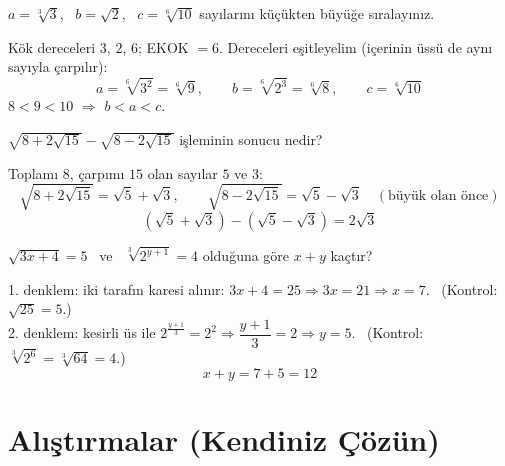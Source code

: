 \begin{alistirma}
\(a=\sqrt[3]{3}\), \ \(b=\sqrt2\), \ \(c=\sqrt[6]{10}\) sayılarını küçükten büyüğe sıralayınız.
\end{alistirma}
\begin{cozum}
Kök dereceleri \(3\), \(2\), \(6\); EKOK \(=6\). Dereceleri eşitleyelim (içerinin üssü de aynı sayıyla çarpılır):
\[a=\sqrt[6]{3^2}=\sqrt[6]{9},\qquad b=\sqrt[6]{2^3}=\sqrt[6]{8},\qquad c=\sqrt[6]{10}\]
\(8<9<10\) \(\Rightarrow\) \(b<a<c\).
\end{cozum}

\begin{alistirma}
\(\sqrt{8+2\sqrt{15}}-\sqrt{8-2\sqrt{15}}\) işleminin sonucu nedir?
\end{alistirma}
\begin{cozum}
Toplamı \(8\), çarpımı \(15\) olan sayılar \(5\) ve \(3\):
\[\sqrt{8+2\sqrt{15}}=\sqrt5+\sqrt3,\qquad \sqrt{8-2\sqrt{15}}=\sqrt5-\sqrt3\quad(\text{büyük olan önce})\]
\[(\sqrt5+\sqrt3)-(\sqrt5-\sqrt3)=2\sqrt3\]
\end{cozum}

\begin{alistirma}
\(\sqrt{3x+4}=5\) \ ve \ \(\sqrt[3]{2^{y+1}}=4\) olduğuna göre \(x+y\) kaçtır?
\end{alistirma}
\begin{cozum}
1. denklem: iki tarafın karesi alınır: \(3x+4=25\Rightarrow 3x=21\Rightarrow x=7\). \ (Kontrol: \(\sqrt{25}=5\).)\\
2. denklem: kesirli üs ile \(2^{\frac{y+1}{3}}=2^2\Rightarrow\dfrac{y+1}{3}=2\Rightarrow y=5\). \ (Kontrol: \(\sqrt[3]{2^6}=\sqrt[3]{64}=4\).)
\[x+y=7+5=12\]
\end{cozum}

\kendinizoncesi
\section{Alıştırmalar (Kendiniz Çözün)}

